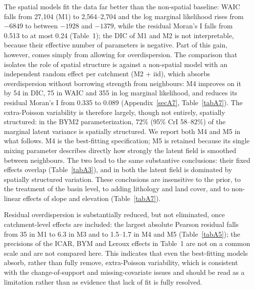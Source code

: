 \documentclass[journal abbreviation, manuscript]{copernicus}
\newcommand{\hl}[1]{#1}
\newcommand{\hlE}[1]{#1}
\begin{document}
\hlE{The spatial models fit the data far better than the non-spatial baseline: WAIC falls from 27,104 (M1) to 2,564--2,704 and the log marginal likelihood rises from $-6849$ to between $-1928$ and $-1379$, while the residual Moran's I falls from 0.513 to at most 0.24 (Table~1); the DIC of M1 and M2 is not interpretable, because their effective number of parameters is negative. Part of this gain, however, comes simply from allowing for overdispersion. The comparison that isolates the role of spatial structure is against a non-spatial model with an independent random effect per catchment (M2 + iid), which absorbs overdispersion without borrowing strength from neighbours: M4 improves on it by 54 in DIC, 75 in WAIC and 355 in log marginal likelihood, and reduces its residual Moran's I from 0.335 to 0.089 (\mbox{Appendix~\ref{secA7}}, \mbox{Table~\ref{tabA7}}). The extra-Poisson variability is therefore largely, though not entirely, spatially structured: in the BYM2 parameterization, 72\% (95\% CrI 58--82\%) of the marginal latent variance is spatially structured. We report both M4 and M5 in what follows. M4 is the best-fitting specification; M5 is retained because its single mixing parameter describes directly how strongly the latent field is smoothed between neighbours. The two lead to the same substantive conclusions: their fixed effects overlap (\mbox{Table~\ref{tabA3}}), and in both the latent field is dominated by spatially structured variation. These conclusions are insensitive to the prior, to the treatment of the basin level, to adding lithology and land cover, and to non-linear effects of slope and elevation (\mbox{Table~\ref{tabA7}}).}

\hl{Residual overdispersion is substantially reduced, but not eliminated,} \hlE{once catchment-level effects are included: the largest absolute Pearson residual falls from 35 in M1 to 6.3 in M3 and to 1.5--1.7 in M4 and M5 (\mbox{Table~\ref{tabA5}}); the precisions of the ICAR, BYM and Leroux effects in Table~1 are not on a common scale and are not compared here.} \hl{ 
This indicates that even the best-fitting models absorb, rather than fully remove, extra-Poisson variability, which is consistent with the change-of-support and missing-covariate issues and should be read as a limitation rather than as evidence that lack of fit is fully resolved.}
\end{document}
